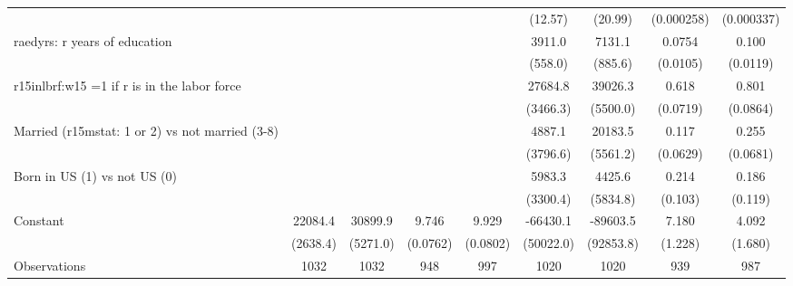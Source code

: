\begin{table}[htbp]
\begin{tabular}{l*{8}{c}}
                &                  &                  &                  &                  &  (12.57)         &  (20.99)         &(0.000258)         &(0.000337)         \\
\addlinespace
raedyrs: r years of education&                  &                  &                  &                  &   3911.0\sym{***}&   7131.1\sym{***}&   0.0754\sym{***}&    0.100\sym{***}\\
                &                  &                  &                  &                  &  (558.0)         &  (885.6)         & (0.0105)         & (0.0119)         \\
\addlinespace
r15inlbrf:w15 =1 if r is in the labor force&                  &                  &                  &                  &  27684.8\sym{***}&  39026.3\sym{***}&    0.618\sym{***}&    0.801\sym{***}\\
                &                  &                  &                  &                  & (3466.3)         & (5500.0)         & (0.0719)         & (0.0864)         \\
\addlinespace
Married (r15mstat: 1 or 2) vs not married (3-8)&                  &                  &                  &                  &   4887.1         &  20183.5\sym{***}&    0.117\sym{*}  &    0.255\sym{***}\\
                &                  &                  &                  &                  & (3796.6)         & (5561.2)         & (0.0629)         & (0.0681)         \\
\addlinespace
Born in US (1) vs not US (0)&                  &                  &                  &                  &   5983.3\sym{*}  &   4425.6         &    0.214\sym{**} &    0.186         \\
                &                  &                  &                  &                  & (3300.4)         & (5834.8)         &  (0.103)         &  (0.119)         \\
\addlinespace
Constant        &  22084.4\sym{***}&  30899.9\sym{***}&    9.746\sym{***}&    9.929\sym{***}& -66430.1         & -89603.5         &    7.180\sym{***}&    4.092\sym{**} \\
                & (2638.4)         & (5271.0)         & (0.0762)         & (0.0802)         &(50022.0)         &(92853.8)         &  (1.228)         &  (1.680)         \\
\midrule
Observations    &     1032         &     1032         &      948         &      997         &     1020         &     1020         &      939         &      987         \\

\end{tabular}
\end{table}
